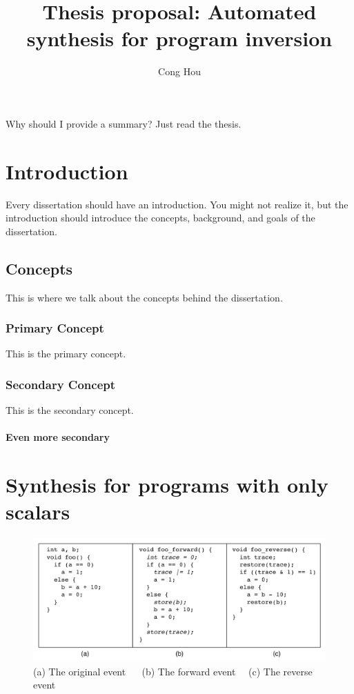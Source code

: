 \documentclass[12pt]{gatech-thesis}
\title{Thesis proposal: Automated synthesis for program inversion} %
\author{Cong Hou}
\begin{document}


\begin{preliminary}



\contents
\begin{summary}
Why should I provide a summary?  Just read the thesis.
\end{summary}
\end{preliminary}
\chapter{Introduction}

Every dissertation should have an introduction.  You might not realize
it, but the introduction should introduce the concepts, background,
and goals of the dissertation.

\section{Concepts}

This is where we talk about the concepts behind the dissertation.

\subsection{Primary Concept}

This is the primary concept.

\subsection{Secondary Concept}

This is the secondary concept.

\subsubsection{Even more secondary}




\chapter{Synthesis for programs with only scalars}


\begin{figure}
\centering
\includegraphics[width=400pt]{figures1/CodeExample.pdf}
\caption{(a) The original event $\quad$ (b) The forward event$\quad$ (c) The reverse event}
\label{fig:code_example}
\end{figure}
\end{document}
